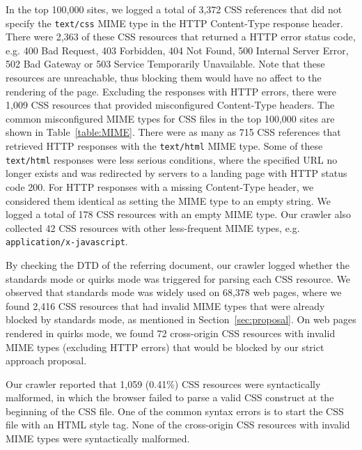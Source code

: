 \documentclass{acm_proc_article-sp}
\begin{document}
In the top 100,000 sites, we logged a total of 3,372 CSS references that did not specify the \verb|text/css| MIME type in the HTTP Content-Type response header. There were 2,363 of these CSS resources that returned a HTTP error status code, e.g. 400 Bad Request, 403 Forbidden, 404 Not Found, 500 Internal Server Error, 502 Bad Gateway or 503 Service Temporarily Unavailable. Note that these resources are unreachable, thus blocking them would have no affect to the rendering of the page. Excluding the responses with HTTP errors, there were 1,009 CSS resources that provided misconfigured Content-Type headers. The common misconfigured MIME types for CSS files in the top 100,000 sites are shown in Table~\ref{table:MIME}. There were as many as 715 CSS references that retrieved HTTP responses with the \verb|text/html| MIME type. Some of these \texttt{text/html} responses were less serious conditions, where the specified URL no longer exists and was redirected by servers to a landing page with HTTP status code 200. For HTTP responses with a missing Content-Type header, we considered them identical as setting the MIME type to an empty string. We logged a total of 178 CSS resources with an empty MIME type. Our crawler also collected 42 CSS resources with other less-frequent MIME types, e.g. \verb|application/x-javascript|. 

By checking the DTD of the referring document, our crawler logged whether the standards mode or quirks mode was triggered for parsing each CSS resource. We observed that standards mode was widely used on 68,378 web pages, where we found 2,416 CSS resources that had invalid MIME types that were already blocked by standards mode, as mentioned in Section~\ref{sec:proposal}. On web pages rendered in quirks mode, we found 72 cross-origin CSS resources with invalid MIME types (excluding HTTP errors) that would be blocked by our strict approach proposal.

Our crawler reported that 1,059 (0.41\%) CSS resources were syntactically malformed, in which the browser failed to parse a valid CSS construct at the beginning of the CSS file. One of the common syntax errors is to start the CSS file with an HTML style tag. None of the cross-origin CSS resources with invalid MIME types were syntactically malformed.

\end{document}
